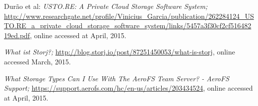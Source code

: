 \begin{thebibliography}{99}
		Dur\~ao et al:
		\emph{USTO.RE: A Private Cloud Storage Software System;}
		\url{http://www.researchgate.net/profile/Vinicius_Garcia/publication/262284124_USTO.RE_a_private_cloud_storage_software_system/links/5457a3f30cf2cf51648219ed.pdf},
		online accessed at April, 2015.

		\emph{What ist Storj?;}
		\url{http://blog.storj.io/post/87251450053/what-is-storj},
		online accessed March, 2015.

		\emph{What Storage Types Can I Use With The AeroFS Team Server? - AeroFS Support;}
		\url{https://support.aerofs.com/hc/en-us/articles/203434524},
		online accessed at April, 2015.

\end{thebibliography}